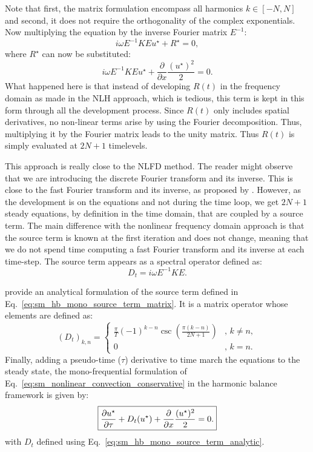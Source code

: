 Note that first, the matrix formulation encompass all harmonics
$k \in [-N, N]$ and second, it does not require the
orthogonality of the complex exponentials.
Now multiplying the equation by the inverse Fourier matrix $E^{-1}$:
\begin{equation}
	i \omega E^{-1} K E u^\star + R^\star = 0,
	\label{eq:sm_hb_matrix_form_mono}
\end{equation}
where $R^\star$ can now be substituted:
\begin{equation}
		i \omega E^{-1} K E u^\star + 
		\displaystyle \frac{\partial}{\partial x}
		\frac{(u^\star)^2}{2} = 0.
\end{equation}
What happened here is that instead of developing $R(t)$
in the frequency domain as made in the NLH approach,
which is tedious, this term is kept
in this form through all the development process. 
Since $R(t)$ only includes spatial derivatives, no non-linear
terms
arise by using the Fourier decomposition. Thus, multiplying it
by the Fourier matrix leads to the unity matrix. 
Thus $R(t)$ is simply evaluated at $2N+1$ timelevels.

This approach is really close to the NLFD method.
The reader might observe that we are introducing the discrete Fourier
transform and its inverse. This is close to the fast Fourier transform
and its inverse, as proposed by \citet{McMullen2001}. However,
as the development is on the equations and not during the time loop,
we get $2N+1$ steady equations, by definition in the time
domain, that are coupled by a source term.
The main difference with the nonlinear frequency domain approach
is that the source term is known at the first iteration and does
not change, meaning that we do not spend time computing a
fast Fourier transform and its inverse at each time-step.
The source term appears as a spectral operator defined as:
\begin{equation}
	D_t = i \omega E^{-1} K E.
	\label{eq:sm_hb_mono_source_term_matrix}
\end{equation}

\citet{Gopinath2005} provide an analytical formulation of the
source term defined in Eq.~\eqref{eq:sm_hb_mono_source_term_matrix}.
It is a matrix operator whose elements are defined as:
\begin{equation}
  (D_t)_{k, n} =
  \begin{cases}
    \frac{\pi}{T}(-1)^{k-n}\csc\left(\frac{\pi
        (k-n)}{2N+1}\right) &, \, k\neq n,\\
    0 &, \, k=n.
  \end{cases}
  \label{eq:sm_hb_mono_source_term_analytic}
\end{equation}
Finally, adding a pseudo-time ($\tau$) derivative to 
time march the equations to the steady state, 
the mono-frequential formulation of 
Eq.~\eqref{eq:sm_nonlinear_convection_conservative} in the harmonic
balance framework is given by:
\begin{equation}
	\fbox{$
	\displaystyle \frac{\partial u^\star}{\partial \tau} + 
	D_t (u^\star) + 
	\displaystyle \frac{\partial}{\partial x}
		\frac{(u^\star)^2}{2} = 0.
	$}
\end{equation}
with $D_t$ defined using Eq.~\eqref{eq:sm_hb_mono_source_term_analytic}.


